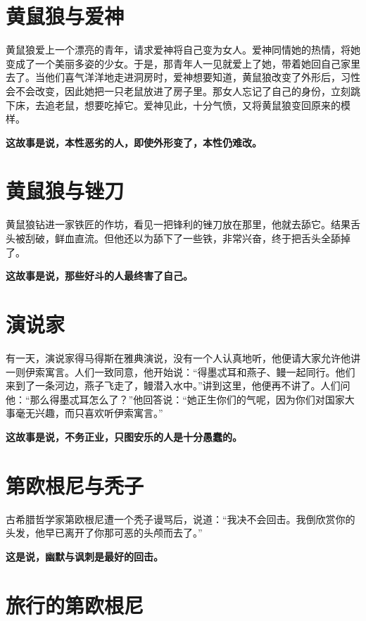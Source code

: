 \section{黄鼠狼与爱神}

黄鼠狼爱上一个漂亮的青年，请求爱神将自己变为女人。爱神同情她的热情，将她变成了一个美丽多姿的少女。于是，那青年人一见就爱上了她，带着她回自己家里去了。当他们喜气洋洋地走进洞房时，爱神想要知道，黄鼠狼改变了外形后，习性会不会改变，因此她把一只老鼠放进了房子里。那女人忘记了自己的身份，立刻跳下床，去追老鼠，想要吃掉它。爱神见此，十分气愤，又将黄鼠狼变回原来的模样。

{\bfseries \color{red}这故事是说，本性恶劣的人，即使外形变了，本性仍难改。}

\section{黄鼠狼与锉刀}

黄鼠狼钻进一家铁匠的作坊，看见一把锋利的锉刀放在那里，他就去舔它。结果舌头被刮破，鲜血直流。但他还以为舔下了一些铁，非常兴奋，终于把舌头全舔掉了。

{\bfseries \color{red}这故事是说，那些好斗的人最终害了自己。}

\section{演说家}

有一天，演说家得马得斯在雅典演说，没有一个人认真地听，他便请大家允许他讲一则伊索寓言。人们一致同意，他开始说：“得墨忒耳和燕子、鳗一起同行。他们来到了一条河边，燕子飞走了，鳗潜入水中。”讲到这里，他便再不讲了。人们问他：“那么得墨忒耳怎么了？”他回答说：“她正生你们的气呢，因为你们对国家大事毫无兴趣，而只喜欢听伊索寓言。”

{\bfseries \color{red}这故事是说，不务正业，只图安乐的人是十分愚蠢的。}

\section{第欧根尼与秃子}

古希腊哲学家第欧根尼遭一个秃子谩骂后，说道：“我决不会回击。我倒欣赏你的头发，他早已离开了你那可恶的头颅而去了。”

{\bfseries \color{red}这是说，幽默与讽刺是最好的回击。}

\section{旅行的第欧根尼}

